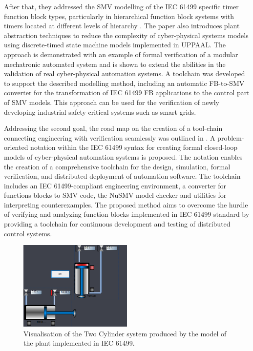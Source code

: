 \begin{bibunit}
After that, they addressed the SMV modelling of the IEC 61499 specific timer function block types, particularly in hierarchical function block systems with timers located at different levels of hierarchy \cite{drozdov2016formal}. The paper also introduces plant abstraction techniques to reduce the complexity of cyber-physical systems models using discrete-timed state machine models implemented in UPPAAL. The approach is demonstrated with an example of formal verification of a modular mechatronic automated system and is shown to extend the abilities in the validation of real cyber-physical automation systems. A toolchain was developed to support the described modelling method, including an automatic FB-to-SMV converter for the transformation of IEC 61499 FB applications to the control part of SMV models. This approach can be used for the verification of newly developing industrial safety-critical systems such as smart grids.

Addressing the second goal, the road map on the creation of a tool-chain connecting engineering with verification seamlessly was outlined in  \cite{vyatkin2008closed}.  A problem-oriented notation within the IEC 61499 syntax for creating formal closed-loop models of cyber-physical automation systems \cite{xavier2021cyber} is proposed. The notation enables the creation of a comprehensive toolchain for the design, simulation, formal verification, and distributed deployment of automation software. The toolchain includes an IEC 61499-compliant engineering environment, a converter for functions blocks to SMV code, the NuSMV model-checker and utilities for interpreting counterexamples. The proposed method aims to overcome the hurdle of verifying and analyzing function blocks implemented in IEC 61499 standard by providing a toolchain for continuous development and testing of distributed control systems. 

\begin{figure}
    \centering
    \includegraphics[width=0.5\textwidth]{MX_Papers/Paper1/images/Two_Cylinder.PNG}
    \caption{Visualisation of the Two Cylinder system produced by the model of the plant implemented in IEC 61499.}
    \label{fig:two_cylinder_HMI}
\end{figure}


\end{bibunit}
